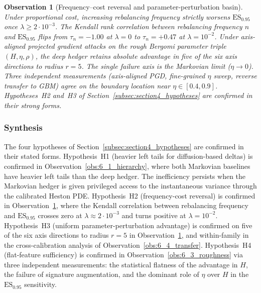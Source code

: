\documentclass[12pt,a4paper]{article}
\theoremstyle{definition}
\theoremstyle{plain}
\theoremstyle{remark}
\theoremstyle{plain}
\newtheorem{observation}{Observation}[section]
\begin{document}
\begin{observation}[Frequency--cost reversal and parameter-perturbation basin]
\label{obs:6_5_perturbation}
Under proportional cost, increasing rebalancing frequency strictly
worsens $\mathrm{ES}_{0.95}$ once $\lambda \geq 2 \cdot 10^{-3}$. The
Kendall rank correlation between rebalancing frequency $n$ and
$\mathrm{ES}_{0.95}$ flips from $\tau_n = -1.00$ at $\lambda = 0$ to
$\tau_n = +0.47$ at $\lambda = 10^{-2}$. Under axis-aligned projected
gradient attacks on the rough Bergomi parameter triple
$(H, \eta, \rho)$, the deep hedger retains absolute advantage in
five of the six axis directions to radius $r = 5$. The single
failure axis is the Markovian limit ($\eta \to 0$). Three independent
measurements (axis-aligned PGD, fine-grained $\eta$ sweep, reverse
transfer to GBM) agree on the boundary location near $\eta \in [0.4,
0.9]$. Hypotheses~H2 and~H3 of
Section~\ref{subsec:section4_hypotheses} are confirmed in their
strong forms.
\end{observation}

\subsubsection{Synthesis}
\label{sec:6_3_6}

The four hypotheses of Section~\ref{subsec:section4_hypotheses} are
confirmed in their stated forms. Hypothesis~H1 (heavier left tails for
diffusion-based deltas) is confirmed in
Observation~\ref{obs:6_1_hierarchy}, where both Markovian baselines
have heavier left tails than the deep hedger. The inefficiency
persists when the Markovian hedger is given privileged access to the
instantaneous variance through the calibrated Heston PDE.
Hypothesis~H2 (frequency-cost reversal) is confirmed in
Observation~\ref{obs:6_5_perturbation}, where the Kendall correlation
between rebalancing frequency and $\mathrm{ES}_{0.95}$ crosses zero
at $\lambda \approx 2 \cdot 10^{-3}$ and turns positive at
$\lambda = 10^{-2}$. Hypothesis~H3 (uniform parameter-perturbation
advantage) is confirmed on five of the six axis directions to radius
$r = 5$ in Observation~\ref{obs:6_5_perturbation}, and within-family
in the cross-calibration analysis of
Observation~\ref{obs:6_4_transfer}. Hypothesis~H4 (flat-feature
sufficiency) is confirmed in Observation~\ref{obs:6_3_roughness} via
three independent measurements: the statistical flatness of the
advantage in $H$, the failure of signature augmentation, and the
dominant role of $\eta$ over $H$ in the $\mathrm{ES}_{0.95}$
sensitivity.
\end{document}
